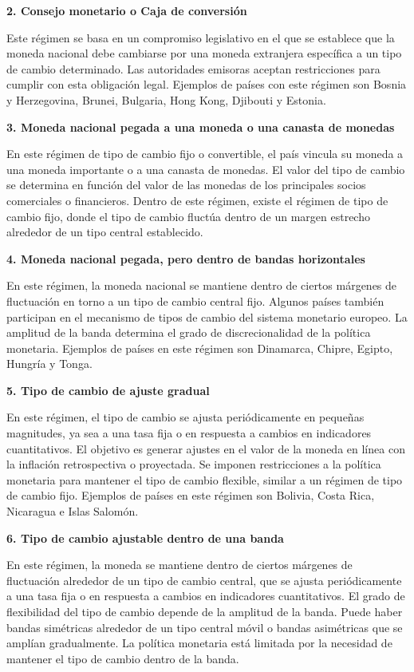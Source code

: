 \documentclass[
  a4paper,
]{article}
\begin{document}
\textbf{2. Consejo monetario o Caja de conversión}

Este régimen se basa en un compromiso legislativo en el que se establece
que la moneda nacional debe cambiarse por una moneda extranjera
específica a un tipo de cambio determinado. Las autoridades emisoras
aceptan restricciones para cumplir con esta obligación legal. Ejemplos
de países con este régimen son Bosnia y Herzegovina, Brunei, Bulgaria,
Hong Kong, Djibouti y Estonia.

\textbf{3. Moneda nacional pegada a una moneda o una canasta de monedas}

En este régimen de tipo de cambio fijo o convertible, el país vincula su
moneda a una moneda importante o a una canasta de monedas. El valor del
tipo de cambio se determina en función del valor de las monedas de los
principales socios comerciales o financieros. Dentro de este régimen,
existe el régimen de tipo de cambio fijo, donde el tipo de cambio
fluctúa dentro de un margen estrecho alrededor de un tipo central
establecido.

\textbf{4. Moneda nacional pegada, pero dentro de bandas horizontales}

En este régimen, la moneda nacional se mantiene dentro de ciertos
márgenes de fluctuación en torno a un tipo de cambio central fijo.
Algunos países también participan en el mecanismo de tipos de cambio del
sistema monetario europeo. La amplitud de la banda determina el grado de
discrecionalidad de la política monetaria. Ejemplos de países en este
régimen son Dinamarca, Chipre, Egipto, Hungría y Tonga.

\textbf{5. Tipo de cambio de ajuste gradual}

En este régimen, el tipo de cambio se ajusta periódicamente en pequeñas
magnitudes, ya sea a una tasa fija o en respuesta a cambios en
indicadores cuantitativos. El objetivo es generar ajustes en el valor de
la moneda en línea con la inflación retrospectiva o proyectada. Se
imponen restricciones a la política monetaria para mantener el tipo de
cambio flexible, similar a un régimen de tipo de cambio fijo. Ejemplos
de países en este régimen son Bolivia, Costa Rica, Nicaragua e Islas
Salomón.

\textbf{6. Tipo de cambio ajustable dentro de una banda}

En este régimen, la moneda se mantiene dentro de ciertos márgenes de
fluctuación alrededor de un tipo de cambio central, que se ajusta
periódicamente a una tasa fija o en respuesta a cambios en indicadores
cuantitativos. El grado de flexibilidad del tipo de cambio depende de la
amplitud de la banda. Puede haber bandas simétricas alrededor de un tipo
central móvil o bandas asimétricas que se amplían gradualmente. La
política monetaria está limitada por la necesidad de mantener el tipo de
cambio dentro de la banda.
\end{document}
